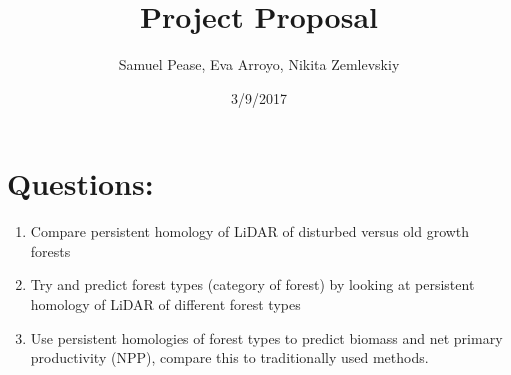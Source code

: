 \documentclass[11pt]{article}
\title{Project Proposal}
\author{Samuel Pease, Eva Arroyo, Nikita Zemlevskiy}
\date{3/9/2017}
\begin{document}
\maketitle
\newpage
\section*{Questions:}

\begin{enumerate}
	\item Compare persistent homology of LiDAR of disturbed versus old growth forests\\
	\item Try and predict forest types (category of forest) by looking at persistent homology of LiDAR of different forest types\\
	\item Use persistent homologies of forest types to predict biomass and net primary productivity (NPP), compare this to traditionally used methods.\\
\end{enumerate}
\end{document}
